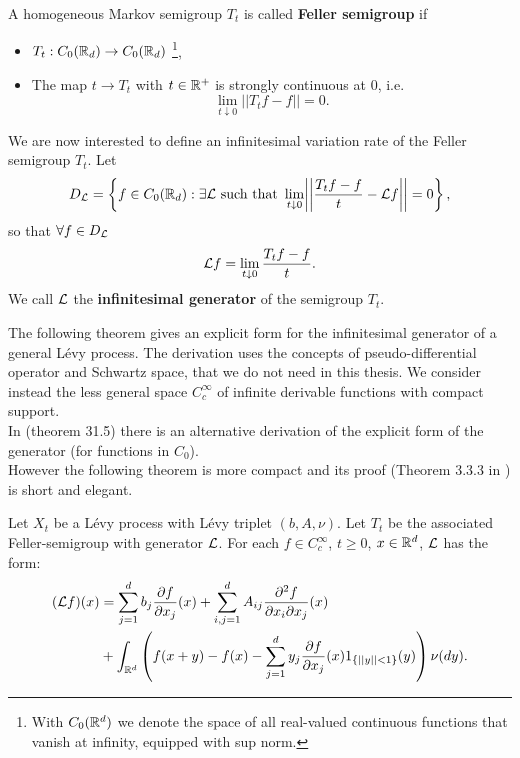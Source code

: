 A homogeneous Markov semigroup $T_t$ is called \textbf{Feller semigroup} if
\begin{itemize}
 \item $T_t : C_0(\mathbb{R}_d) \to C_0(\mathbb{R}_d) $ 
 \footnote{With $C_0(\mathbb{R}^d)$ we denote the space of all real-valued continuous functions that vanish at infinity, equipped with sup norm.},
 \item The map $t \to T_t $ with $t \in \mathbb{R}^+$ is strongly continuous at 0, i.e. $$\lim_{t \downarrow 0} ||T_t f - f|| = 0.$$ 
\end{itemize}

\begin{Definition}
We are now interested to define an infinitesimal variation rate of the Feller semigroup $T_t$.
Let 
\begin{equation}
 D_{\mathcal{L}} = \left\{ f\in C_0(\mathbb{R}_d) : \exists \mathcal{L} \mbox{ such that } \lim_{t \downarrow 0} 
 \biggr|\biggr|\frac{T_t f - f}{t} -\mathcal{L} f \biggr|\biggr| = 0\right\},
\end{equation}
so that $\forall f \in D_{\mathcal{L}}$
\begin{equation} \label{generator}
 \mathcal{L} f = \lim_{t \downarrow 0} \frac{T_t f - f}{t}.
\end{equation}
We call $\mathcal{L}$ the \textbf{infinitesimal generator} of the semigroup $T_t$. \\
\end{Definition}

\vspace{1em}
The following theorem gives an explicit form for the infinitesimal generator 
of a general Lévy process.
The derivation uses the concepts of pseudo-differential operator and Schwartz space, that we do not need in this thesis.
We consider instead the less general space $C_c^{\infty}$ of infinite derivable functions with compact support.\\  
In \cite{Sato} (theorem 31.5) there is an alternative derivation of the explicit form of the generator 
(for functions in $C_0$). \\
However the following theorem is more compact
and its proof (Theorem 3.3.3 in \cite{Applebaum}) is short and elegant.
\begin{Theorem}
 Let $X_t$ be a Lévy process with Lévy triplet $(b,A,\nu)$. Let $T_t$ be the associated Feller-semigroup
 with generator $\mathcal{L}$. For each $f\in C_c^{\infty}$, $t\geq0$, $x\in \mathbb{R}^d$, 
  $\mathcal{L}$ has the form:
 \begin{align}\label{genLevy}
  (\mathcal{L} f)(x) &= \sum_{j=1}^{d} b_j \frac{\partial f}{\partial x_j}(x) +
  \sum_{i,j=1}^{d} A_{ij} \frac{\partial^2 f}{\partial x_i \partial x_j}(x)\\  
           & + \int_{\mathbb{R}^d} \left( f(x+y) - f(x) - \sum_{j=1}^{d} y_j \frac{\partial f}{\partial x_j}(x) 
           1_{\{ ||y||<1 \}}(y) \right) \nu(dy).   \nonumber
  \end{align}
\end{Theorem}

